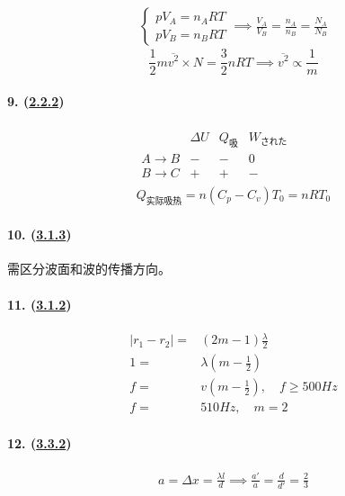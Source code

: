 \begin{gather*}
    \begin{cases}
        pV_A=n_ART\\
        pV_B=n_BRT
    \end{cases}\implies
    \frac{V_A}{V_B}=\frac{n_A}{n_B}=\frac{N_A}{N_B}
\end{gather*}
\begin{equation*}
    \frac12m\overline{v^2}\times N=\frac32nRT\implies
    \overline{v^2}\propto\frac1m
\end{equation*}

\paragraph{9. (\hyperref[subsec:2.2.2]{2.2.2})}

\begin{gather*}
    \begin{array}{c|ccc}
        & \Delta U & Q_\textrm{吸} & W_\textrm{された} \\\hline
        A\to B & - & - & 0 \\
        B\to C & + & + & -
    \end{array}\\
    Q_\textrm{实际吸热}=n(C_p-C_v)T_0=nRT_0
\end{gather*}

\paragraph{10. (\hyperref[subsec:3.1.3]{3.1.3})} 需区分波面和波的传播方向。
\paragraph{11. (\hyperref[subsec:3.1.2]{3.1.2})}

\begin{align*}
    |r_1-r_2|=&(2m-1)\frac\lambda2\\
    1=&\lambda\left(m-\frac12\right)\\
    f=&v\left(m-\frac12\right),\quad f\ge500Hz\\
    f=&510Hz,\quad m=2
\end{align*}

\paragraph{12. (\hyperref[subsec:3.3.2]{3.3.2})}

\begin{gather*}
    a=\Delta x=\frac{\lambda l}{d}\implies
    \frac{a'}{a}=\frac{d}{d'}=\frac23
\end{gather*}


